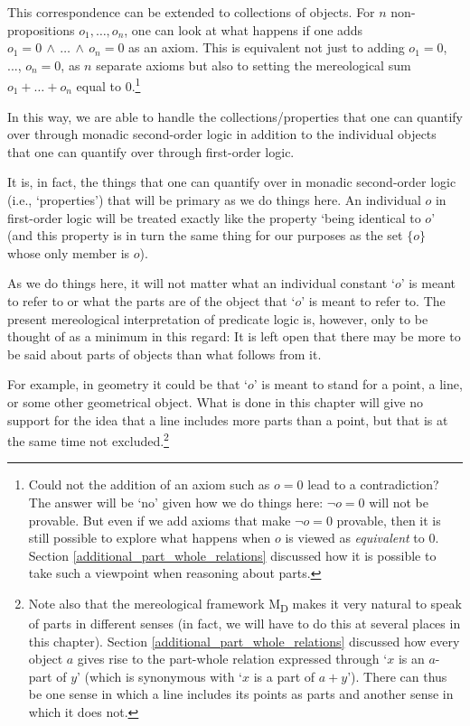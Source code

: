 \documentclass[12pt]{book}
\begin{document}
This correspondence can be extended to collections of objects. For $n$ non-propositions $o_1, \ldots, o_n$, one can look at what happens if one adds $o_1 = 0 \,\wedge\, \ldots \,\wedge\, o_n = 0$ as an axiom. This is equivalent not just to adding $o_1 = 0$, ..., $o_n = 0$, as $n$ separate axioms but also to setting the mereological sum $o_1 + \ldots + o_n$ equal to 0.\footnote{Could not the addition of an axiom such as $o = 0$ lead to a contradiction? The answer will be `no' given how we do things here: $\neg o = 0$ will not be provable. But even if we add axioms that make $\neg o = 0$ provable, then it is still possible to explore what happens when $o$ is viewed as \textit{equivalent} to 0. Section \ref{additional_part_whole_relations} discussed how it is possible to take such a viewpoint when reasoning about parts.}

In this way, we are able to handle the collections/properties that one can quantify over through monadic second-order logic in addition to the individual objects that one can quantify over through first-order logic.

It is, in fact, the things that one can quantify over in monadic second-order logic (i.e., `properties') that will be primary as we do things here. An individual $o$ in first-order logic will be treated exactly like the property `being identical to $o$' (and this property is in turn the same thing for our purposes as the set $\{o\}$ whose only member is $o$).

As we do things here, it will not matter what an individual constant ‘$o$’ is meant to refer to or what the parts are of the object that ‘$o$’ is meant to refer to. The present mereological interpretation of predicate logic is, however, only to be thought of as a minimum in this regard: It is left open that there may be more to be said about parts of objects than what follows from it.

For example, in geometry it could be that ‘$o$’ is meant to stand for a point, a line, or some other geometrical object. What is done in this chapter will give no support for the idea that a line includes more parts than a point, but that is at the same time not excluded.\footnote{Note also that the mereological framework M\textsubscript{D} makes it very natural to speak of parts in different senses (in fact, we will have to do this at several places in this chapter). Section \ref{additional_part_whole_relations} discussed how every object $a$ gives rise to the part-whole relation expressed through ‘$x$ is an $a$-part of $y$’ (which is synonymous with ‘$x$ is a part of $a + y$’). There can thus be one sense in which a line includes its points as parts and another sense in which it does not.}
\end{document}
